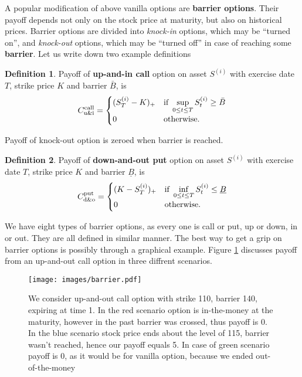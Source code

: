 \documentclass[a4paper,12pt, twoside]{book}
\theoremstyle{definition}
\newtheorem{mydef}{Definition}[section]
\theoremstyle{remark}
\begin{document}
A popular modification of above vanilla options are \textbf{barrier options}. Their payoff depends not only on the stock price at maturity, but also on historical prices. Barrier options are divided into \textit{knock-in} options, which may be ``turned on'', and \textit{knock-out} options, which may be ``turned off'' in case of reaching some \textbf{barrier}. Let us write down two example definitions
\begin{mydef}
Payoff of \textbf{up-and-in call} option on asset $S^{(i)}$ with exercise date $T$, strike price $K$ and barrier $\bar{B}$, is
\[ C^{\hbox{\scriptsize call}}_{\hbox{\scriptsize u\&i}} = 
\begin{cases}
 (S^{(i)}_T - K)_+    & \hbox{if } \sup\limits_{0 \leq t \leq T} S^{(i)}_t \geq \bar{B}\\
 0                    & \hbox{otherwise.}
\end{cases}
\]
\end{mydef}
Payoff of knock-out option is zeroed when barrier is reached.
\begin{mydef}
Payoff of \textbf{down-and-out put} option on asset $S^{(i)}$ with exercise date $T$, strike price $K$ and barrier $\underline{B}$, is
\[ C^{\hbox{\scriptsize put}}_{\hbox{\scriptsize d\&o}} = 
\begin{cases}
 (K - S^{(i)}_T)_+    & \hbox{if } \inf\limits_{0 \leq t \leq T} S^{(i)}_t \leq \underline{B}\\
 0                    & \hbox{otherwise.}
\end{cases}
\]
\end{mydef}
We have eight types of barrier options, as every one is call or put, up or down, in or out. They are all defined in similar manner. The best way to get a grip on barrier options is possibly through a graphical example. Figure \ref{fig:barrier} discusses payoff from an up-and-out call option in three diffrent scenarios. 
\begin{figure}[!ht]
\centering
 \texttt{[image: images/barrier.pdf]}
\caption{We consider up-and-out call option with strike 110, barrier 140, expiring at time 1. In the red scenario option is in-the-money at the maturity, however in the past barrier was crossed, thus payoff is 0. In the blue scenario stock price ends about the level of 115, barrier wasn't reached, hence our payoff equals 5. In case of green scenario payoff is 0, as it would be for vanilla option, because we ended out-of-the-money }
\label{fig:barrier}
\end{figure}
\end{document}
